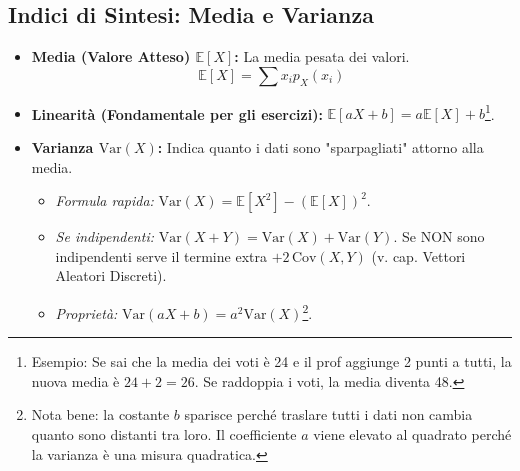\documentclass[12pt]{extarticle} %
\begin{document}
\subsection{Indici di Sintesi: Media e Varianza}
\begin{itemize}
    \item \textbf{Media (Valore Atteso) $\mathbb{E}[X]$:} La media pesata dei valori.
    \begin{equation*}
        \mathbb{E}[X] = \sum x_i p_X(x_i)
    \end{equation*}
    \item \textbf{Linearità (Fondamentale per gli esercizi):} $\mathbb{E}[aX + b] = a\mathbb{E}[X] + b$\footnote{Esempio: Se sai che la media dei voti è 24 e il prof aggiunge 2 punti a tutti, la nuova media è $24+2=26$. Se raddoppia i voti, la media diventa 48.}.
    \item \textbf{Varianza $\mathrm{Var}(X)$:} Indica quanto i dati sono "sparpagliati" attorno alla media.
    \begin{itemize}
        \item \textit{Formula rapida:} $\mathrm{Var}(X) = \mathbb{E}[X^2] - (\mathbb{E}[X])^2$.
        \item \textit{Se indipendenti:} $\mathrm{Var}(X + Y) = \mathrm{Var}(X) + \mathrm{Var}(Y)$. {\footnotesize Se NON sono indipendenti serve il termine extra $+2\,\mathrm{Cov}(X,Y)$ (v. cap. Vettori Aleatori Discreti).}
        \item \textit{Proprietà:} $\mathrm{Var}(aX + b) = a^2 \mathrm{Var}(X)$\footnote{Nota bene: la costante $b$ sparisce perché traslare tutti i dati non cambia quanto sono distanti tra loro. Il coefficiente $a$ viene elevato al quadrato perché la varianza è una misura quadratica.}.
    \end{itemize}
\end{itemize}
\end{document}
